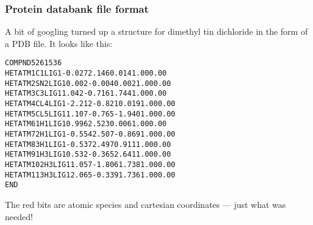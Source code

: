 
\begin{frame}[fragile]
  \frametitle{Protein databank file format}
  A bit of googling turned up a structure for dimethyl tin dichloride
  in the form of a PDB file.  It looks like this:

  \begin{block}{}
\begin{alltt}
\scriptsize
COMPND    5261536
HETATM    1 \alert{ C}1  LIG     1      \alert{-0.027   2.146   0.014}  1.00  0.00
HETATM    2 \alert{SN}2  LIG     1      \alert{ 0.002  -0.004   0.002}  1.00  0.00
HETATM    3 \alert{ C}3  LIG     1      \alert{ 1.042  -0.716   1.744}  1.00  0.00
HETATM    4 \alert{CL}4  LIG     1      \alert{-2.212  -0.821   0.019}  1.00  0.00
HETATM    5 \alert{CL}5  LIG     1      \alert{ 1.107  -0.765  -1.940}  1.00  0.00
HETATM    6 1\alert{H}1  LIG     1      \alert{ 0.996   2.523   0.006}  1.00  0.00
HETATM    7 2\alert{H}1  LIG     1      \alert{-0.554   2.507  -0.869}  1.00  0.00
HETATM    8 3\alert{H}1  LIG     1      \alert{-0.537   2.497   0.911}  1.00  0.00
HETATM    9 1\alert{H}3  LIG     1      \alert{ 0.532  -0.365   2.641}  1.00  0.00
HETATM   10 2\alert{H}3  LIG     1      \alert{ 1.057  -1.806   1.738}  1.00  0.00
HETATM   11 3\alert{H}3  LIG     1      \alert{ 2.065  -0.339   1.736}  1.00  0.00
END
\end{alltt}
  \end{block}

The \alert{red bits} are atomic species and cartesian coordinates ---
just what was needed!
\end{frame}

